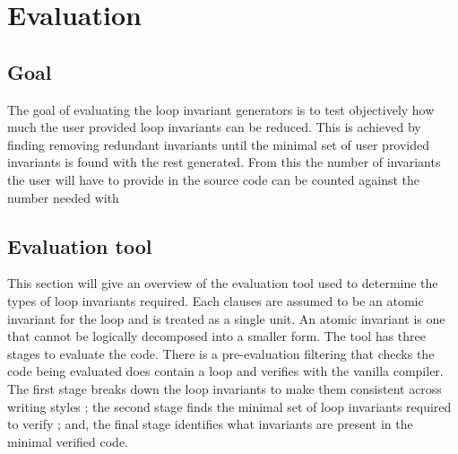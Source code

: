 \chapter{Evaluation}\label{C:eval}

\section{Goal}

The goal of evaluating the loop invariant generators is to test objectively how much the
user provided loop invariants can be reduced.
This is achieved by finding removing redundant invariants until the minimal
set of user provided invariants is found with the rest generated.
From this the number of invariants the user will have to provide
in the source code can be counted against the number needed with 


\section{Evaluation tool}\label{S:eval-tool}

This section will give an overview of the evaluation tool used to
determine the types of loop invariants required.
Each  clauses are assumed to be an atomic invariant for the loop and is treated as a single unit.
An atomic invariant is one that cannot be logically decomposed into a smaller form. 
The tool has three stages to evaluate the code.
There is a pre-evaluation filtering that checks the code being evaluated does
contain a loop and verifies with the vanilla compiler.
The first stage breaks down the loop invariants to make them consistent
across writing styles ;
the second stage finds the minimal set of loop invariants required to verify ;
and, the final stage identifies what invariants are present in the minimal
verified code.


